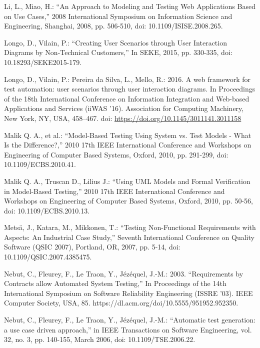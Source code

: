 \documentclass[a4paper,10pt, bibliography=totocnumbered]{scrreprt}
\begin{document}
\begin{thebibliography}{9}
 Li, L., Miao, H.: \enquote{An Approach to Modeling and Testing Web Applications Based on Use Cases,} 2008 International Symposium on Information Science and Engineering, Shanghai, 2008, pp. 506-510, doi: 10.1109/ISISE.2008.265.

 Longo, D., Vilain, P.: \enquote{Creating User Scenarios through User Interaction Diagrams by Non-Technical Customers,} In SEKE, 2015, pp. 330-335, doi: 10.18293/SEKE2015-179.

 Longo, D., Vilain, P.: Pereira da Silva, L., Mello, R.: 2016. A web framework for test automation: user scenarios through user interaction diagrams. In Proceedings of the 18th International Conference on Information Integration and Web-based Applications and Services (iiWAS '16). Association for Computing Machinery, New York, NY, USA, 458–467. doi: \url{https://doi.org/10.1145/3011141.3011158}

 Malik Q. A., et al.: \enquote{Model-Based Testing Using System vs. Test Models - What Is the Difference?,} 2010 17th IEEE International Conference and Workshops on Engineering of Computer Based Systems, Oxford, 2010, pp. 291-299, doi: 10.1109/ECBS.2010.41.

 Malik Q. A., Truscan D., Lilius J.: \enquote{Using UML Models and Formal Verification in Model-Based Testing,} 2010 17th IEEE International Conference and Workshops on Engineering of Computer Based Systems, Oxford, 2010, pp. 50-56, doi: 10.1109/ECBS.2010.13.

 Metsä, J., Katara, M., Mikkonen, T.: \enquote{Testing Non-Functional Requirements with Aspects: An Industrial Case Study,} Seventh International Conference on Quality Software (QSIC 2007), Portland, OR, 2007, pp. 5-14, doi: 10.1109/QSIC.2007.4385475.

 Nebut, C., Fleurey, F., Le Traon, Y., Jézéquel, J.-M.: 2003. \enquote{Requirements by Contracts allow Automated System Testing,} In Proceedings of the 14th International Symposium on Software Reliability Engineering (ISSRE '03). IEEE Computer Society, USA, 85.
https://dl.acm.org/doi/10.5555/951952.952350.

 Nebut, C., Fleurey, F., Le Traon, Y., Jézéquel, J.-M.: \enquote{Automatic test generation: a use case driven approach,} in IEEE Transactions on Software Engineering, vol. 32, no. 3, pp. 140-155, March 2006, doi: 10.1109/TSE.2006.22.


\end{thebibliography}
\end{document}
